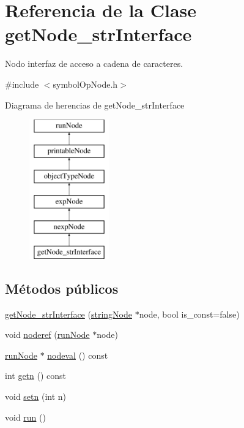 \hypertarget{classgetNode__strInterface}{\section{Referencia de la Clase get\-Node\-\_\-str\-Interface}
\label{classgetNode__strInterface}
}


Nodo interfaz de acceso a cadena de caracteres.  




{\ttfamily \#include $<$symbol\-Op\-Node.\-h$>$}

Diagrama de herencias de get\-Node\-\_\-str\-Interface\begin{figure}[H]
\begin{center}
\leavevmode
\includegraphics[height=6.000000cm]{classgetNode__strInterface}
\end{center}
\end{figure}
\subsection*{Métodos públicos}
\begin{DoxyCompactItemize}
\item 
\hyperlink{classgetNode__strInterface_a685d7151ef5bacd0d06f3f2a5c8d62dc}{get\-Node\-\_\-str\-Interface} (\hyperlink{classstringNode}{string\-Node} $\ast$node, bool is\-\_\-const=false)
\item 
void \hyperlink{classgetNode__strInterface_a90e1e044d69c5af4deab5f93075df7d0}{noderef} (\hyperlink{classrunNode}{run\-Node} $\ast$node)
\item 
\hyperlink{classrunNode}{run\-Node} $\ast$ \hyperlink{classgetNode__strInterface_aaebee470663c3ed0c7fd063e704f77a1}{nodeval} () const 
\item 
int \hyperlink{classgetNode__strInterface_ada502d26ea9519984066d1e7633011d6}{getn} () const 
\item 
void \hyperlink{classgetNode__strInterface_adeb9e355ff7faff958ad7563e74aa1a5}{setn} (int n)
\item 
void \hyperlink{classgetNode__strInterface_ad7ab23855d231a9747a0c89ac392fcd2}{run} ()
\end{DoxyCompactItemize}
